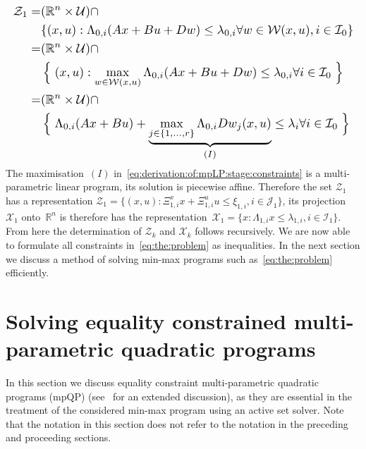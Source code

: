 \documentclass{ifacconf}
\newcommand*{\Resize}[1]{\resizebox{\columnwidth}{!}{$#1$}}
\begin{document}
\begin{equation}\label{eq:derivation:of:mpLP:stage:constraints}
\Resize{
\begin{aligned}
	\mathcal Z_1 =& (\mathbb R^n\times\mathcal U)\cap\\
	&\{(x,u):\Lambda_{0,i}(Ax+Bu+Dw)\leq\lambda_{0,i} \forall w\in\mathcal W(x,u),i\in\mathcal I_0\}\\
	=&(\mathbb R^n\times\mathcal U)\cap\\
	&\left\{\vphantom{\max_{w}}\right.
	(x,u):\max_{w\in\mathcal W(x,u)}\Lambda_{0,i}(Ax+Bu+Dw)\leq\lambda_{0,i}\forall i\in\mathcal I_0
	\left.\vphantom{\max_w}\right\}\\
	=&(\mathbb R^n\times\mathcal U)\cap\\
	&\left\{\vphantom{\max_{w}}\right.
	\Lambda_{0,i}(Ax+Bu)+ \underbrace{\max_{j\in\{1,\dots,r\}}\Lambda_{0,i} Dw_j(x,u)}_{(I)}\leq\lambda_i\forall i\in\mathcal I_0
	\left.\vphantom{\max_w}\right\}
\end{aligned}
}
\end{equation}
The maximisation~$(I)$ in~\eqref{eq:derivation:of:mpLP:stage:constraints} is a multi-parametric
linear program, its solution is piecewise affine. Therefore the set $\mathcal Z_1$ has a representation
$\mathcal Z_1=\{(x,u):\Xi^x_{1,i}x+\Xi^u_{1,i}u\leq\xi_{1,i},i\in\mathcal J_1\}$, its projection~$\mathcal X_1$ 
onto~$\mathbb R^n$ is therefore has the representation~$\mathcal X_1 = \{x:\Lambda_{1,i} x\leq\lambda_{1,i},i\in\mathcal I_1\}$.
From here the determination of $\mathcal Z_k$ and $\mathcal X_k$ follows recursively. We are now able to formulate 
all constraints in~\eqref{eq:the:problem} as inequalities. In the next section we discuss a method of solving
min-max programs such as~\eqref{eq:the:problem} efficiently.


\section{Solving equality constrained multi-parametric quadratic programs}\label{sec:gen:mpQP}
In this section we discuss equality constraint multi-parametric quadratic programs (mpQP) 
(see~\cite{bemporad02,Tondel:2003} for an extended discussion), as they are essential in the treatment 
of the considered min-max program using an active set solver. Note that the notation in this section does 
not refer to the notation in the preceding and proceeding sections.
\end{document}
